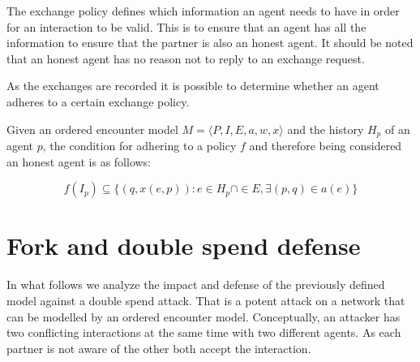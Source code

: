 The exchange policy defines which information an agent needs to have in order for an interaction to 
be valid. This is to ensure that an agent has all the information to ensure that the partner is also
an honest agent. It should be noted that an honest agent has no reason not to reply to an exchange 
request. 

As the exchanges are recorded it is possible to determine whether an agent adheres to a certain 
exchange policy. 

\begin{defn}
    Given an ordered encounter model $M = \langle P, I, E, a, w, x \rangle$ and the history $H_p$ of an
    agent $p$, the condition for adhering to a policy $f$ and
    therefore being considered an honest agent is as follows: 

    \begin{equation}
        f(I_p) \subseteq \{ (q, x(e, p)) : e \in H_p \cap \in E,  \exists (p, q) \in a(e)\}
    \end{equation}
\end{defn}






\section{Fork and double spend defense}
\label{sec:model_double_spend}
In what follows we analyze the impact and defense of the previously defined model against a double spend attack. That is a potent 
attack on a network that can be modelled by an ordered encounter model. Conceptually, an attacker 
has two conflicting interactions at the same time with two different agents. As each partner is not
aware of the other both accept the interaction. 

